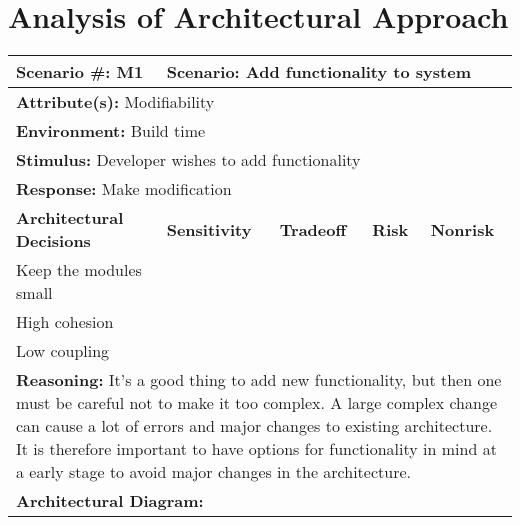 \section{Analysis of Architectural Approach}

\begin{tabular}{|m{}|m{}|m{}|m{}|m{}|m{}|}
  \hline
  {\bf Scenario \#:} M1 & \multicolumn{5}{m{0.75 \textwidth}|}{{\bf Scenario:} Add functionality to system} \\ \hline
  \multicolumn{6}{|m{0.9 \textwidth}|}{{\bf Attribute(s):} Modifiability} \\ \hline
  \multicolumn{6}{|m{0.9 \textwidth}|}{{\bf Environment:} Build time} \\ \hline
  \multicolumn{6}{|m{0.9 \textwidth}|}{{\bf Stimulus:} Developer wishes to add functionality} \\ \hline
  \multicolumn{6}{|m{0.9 \textwidth}|}{{\bf Response:} Make modification} \\ \hline
  \multicolumn{2}{|m{0.3 \textwidth}|}{\bf Architectural Decisions} & {\bf Sensitivity} & {\bf Tradeoff} & {\bf Risk} & {\bf Nonrisk} \\ \hline
  \multicolumn{2}{|m{0.3 \textwidth}|}{Keep the modules small} &  &  &  &  \\ \hline
  \multicolumn{2}{|m{0.3 \textwidth}|}{High cohesion} &  &  &  &  \\ \hline
  \multicolumn{2}{|m{0.3 \textwidth}|}{Low coupling} &  &  &  &  \\ \hline
  \multicolumn{6}{|m{0.9 \textwidth}|}{{\bf Reasoning:} It's a good thing to add new functionality, but then one must be careful not to make it too complex. A large complex change can cause a lot of errors and major changes to existing architecture. It is therefore important to have options for functionality in mind at a early stage to avoid major changes in the architecture.} \\ \hline
  \multicolumn{6}{|m{0.9 \textwidth}|}{{\bf Architectural Diagram:} } \\ \hline
\end{tabular}

